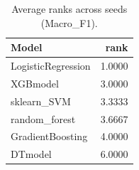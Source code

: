 \begin{table}[t]
\centering
\begin{tabular}{lr}
\toprule
Model & rank \\
\midrule
LogisticRegression & 1.0000 \\
XGBmodel & 3.0000 \\
sklearn_SVM & 3.3333 \\
random_forest & 3.6667 \\
GradientBoosting & 4.0000 \\
DTmodel & 6.0000 \\
\bottomrule
\end{tabular}
\caption{Average ranks across seeds (Macro_F1).}
\label{tab:avg_rank_Macro_F1}
\end{table}